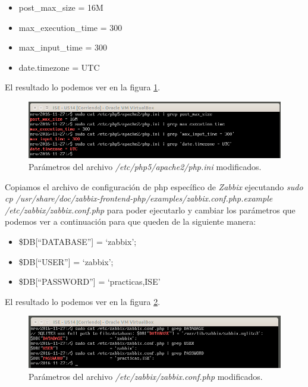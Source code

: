 \documentclass[a4paper,titlepage,12pt]{report}	%
\numberwithin{figure}{section} %
\numberwithin{table}{section} %
\begin{document}
	\begin{itemize}
	   \item post\_max\_size = 16M
	   \item max\_execution\_time = 300
	   \item max\_input\_time = 300
	   \item date.timezone = UTC
	\end{itemize}

	El resultado lo podemos ver en la figura \ref{P3-O4-7}.

	\begin{figure}[H]
	   \includegraphics[width=\linewidth]{./Imagenes/P3/O4-7.png}
	   \vspace{-0.5cm}
	   \caption[Parámetros del archivo \textit{/etc/php5/apache2/php.ini} modificados.]{Parámetros del archivo \textit{/etc/php5/apache2/php.ini} modificados.}
	   \label{P3-O4-7}
	\end{figure}

	Copiamos el archivo de configuración de php específico de \textit{Zabbix} ejecutando \textit{sudo cp /usr/share/doc/zabbix-frontend-php/examples/zabbix.conf.php.example /etc/zabbix/zabbix.conf.php} para poder ejecutarlo y cambiar los parámetros que podemos ver a continuación para que queden de la siguiente manera:
	\begin{itemize}
	   \item \$DB[``DATABASE''] = `zabbix';
	   \item \$DB[``USER''] = `zabbix';
	   \item \$DB[``PASSWORD''] = `practicas,ISE'
	\end{itemize}

	El resultado lo podemos ver en la figura \ref{P3-O4-8}.

	\begin{figure}[H]
	   \includegraphics[width=\linewidth]{./Imagenes/P3/O4-8.png}
	   \vspace{-0.5cm}
	   \caption[Parámetros del archivo \textit{/etc/zabbix/zabbix.conf.php} modificados.]{Parámetros del archivo \textit{/etc/zabbix/zabbix.conf.php} modificados.}
	   \label{P3-O4-8}
	\end{figure}
\end{document}
